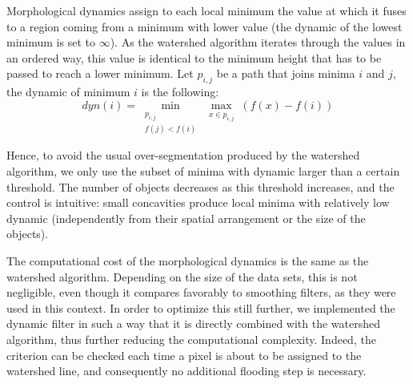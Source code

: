 Morphological dynamics assign to each local minimum the value at which
it fuses to a region coming from a minimum with lower value (the
dynamic of the lowest minimum is set to $\infty$). As the watershed
algorithm iterates through the values in an ordered way, this value is
identical to the minimum height that has to be passed to reach a lower
minimum. Let $p_{i,j}$ be a path that joins minima $i$ and $j$, the dynamic of minimum $i$ is the following:
\[ dyn(i) = \min_{\substack{p_{i,j} \\ f (j)<f (i)}} \max_{\substack{x\in p_{i,j}}} (f(x) - f(i))\]

Hence, to avoid the usual over-segmentation produced by the watershed
algorithm, we only use the subset of minima with dynamic larger than a
certain threshold. The number of objects decreases as this threshold
increases, and the control is intuitive: small concavities produce
local minima with relatively low dynamic (independently from their
spatial arrangement or the size of the objects). 

The computational cost of the morphological dynamics is the same as
the watershed algorithm. Depending on the size of the data sets, this
is not negligible, even though it compares favorably to 
smoothing filters, as they were used in this context. In order to optimize this still further, we
implemented the dynamic filter in such a way that it is directly
combined with the watershed algorithm, thus further reducing the
computational complexity. Indeed, the criterion can be checked each
time a pixel is about to be assigned to the watershed line, and
consequently no additional flooding step is necessary. 

%


